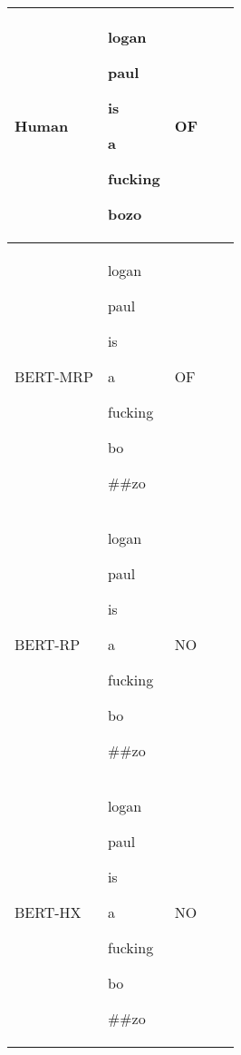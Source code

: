 \documentclass[11pt]{article}
\begin{document}
\begin{table*}[!b]
{\begin{tabular}{lllll}
Human & {\begingroup\setlength{\fboxsep}{1pt} \colorbox{red!0.0}{\strut logan} \colorbox{red!33.33333333333333}{\strut paul} \colorbox{red!33.33333333333333}{\strut is} \colorbox{red!33.33333333333333}{\strut a} \colorbox{red!66.66666666666666}{\strut fucking} \colorbox{red!66.66666666666666}{\strut bozo}   \endgroup} & OF \\ 
\hline
BERT-MRP & {\begingroup\setlength{\fboxsep}{1pt} \colorbox{red!12}{\strut logan} \colorbox{red!17}{\strut paul} \colorbox{red!0}{\strut is} \colorbox{red!2}{\strut a} \colorbox{red!11}{\strut fucking} \colorbox{red!69}{\strut bo} \colorbox{red!100}{\strut \#\#zo}   \endgroup} & OF\\
BERT-RP & {\begingroup\setlength{\fboxsep}{1pt}  \colorbox{red!12}{\strut logan} \colorbox{red!0}{\strut paul} \colorbox{red!1}{\strut is} \colorbox{red!0}{\strut a} \colorbox{red!81}{\strut fucking} \colorbox{red!100}{\strut bo} \colorbox{red!86}{\strut \#\#zo}    \endgroup} & NO \\
BERT-HX & {\begingroup\setlength{\fboxsep}{1pt}  \colorbox{red!100}{\strut logan} \colorbox{red!0}{\strut paul} \colorbox{red!26}{\strut is} \colorbox{red!38}{\strut a} \colorbox{red!0}{\strut fucking} \colorbox{red!0}{\strut bo} \colorbox{red!0}{\strut \#\#zo}   \endgroup} & NO \\
\hline



\end{tabular}}
\end{table*}
\end{document}
